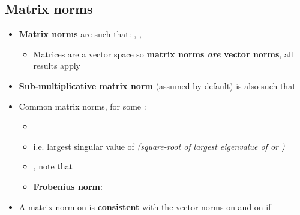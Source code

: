 \subsection*{Matrix norms}

\begin{itemize}

      \item
            \textbf{Matrix norms} are such that:
            ,
            ,

            \begin{itemize}

                  \item
                        Matrices  are a vector space so
                        \textbf{matrix norms \emph{are} vector norms}, all results apply
            \end{itemize}
      \item
            \textbf{Sub-multiplicative matrix norm} (assumed by default) is also
            such that
      \item
            Common matrix norms, for some
            :

            \begin{itemize}

                  \item
                  \item
                        i.e. largest singular value of  \emph{(square-root of largest eigenvalue of  or
                              )}
                  \item
                        ,
                        note that
                  \item
                        \textbf{Frobenius norm}:
            \end{itemize}
      \item
            A matrix norm \iMbox{\|\cdot\|} on  is
            \textbf{consistent} with the vector norms  on
             and  on 
            if


\end{itemize}

